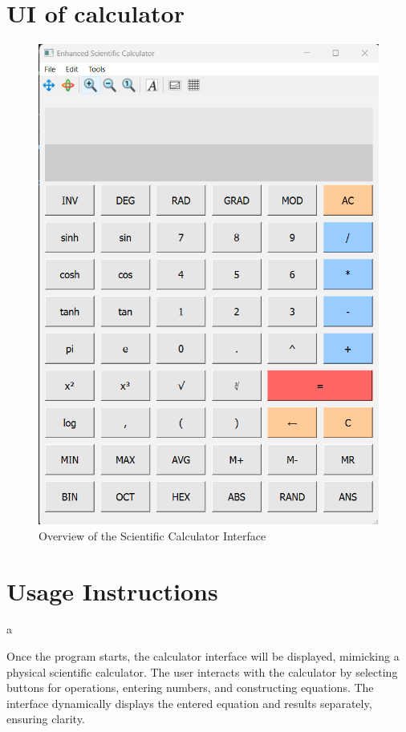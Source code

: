 \documentclass[a4paper,12pt]{article}
\begin{document}
\section*{UI of calculator}
\begin{figure}[H]
    \centering
    \includegraphics[width=\textwidth]{cal.png}
    \caption{Overview of the Scientific Calculator Interface} 
    \label{fig:calculator}
\end{figure}
\newpage

\section{Usage Instructions}a

Once the program starts, the calculator interface will be displayed, mimicking a physical scientific calculator. The user interacts with the calculator by selecting buttons for operations, entering numbers, and constructing equations. The interface dynamically displays the entered equation and results separately, ensuring clarity.
\end{document}
